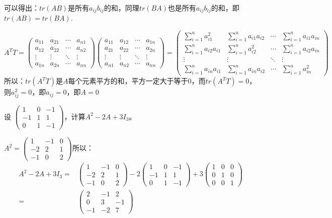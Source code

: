 \documentclass[a4paper]{report}
\begin{document}
\begin{zhengming}
可以得出：$tr(AB)$是所有$a_{ij}b_{ij}$的和，同理$tr(BA)$也是所有$a_{ij}b_{ij}$的和，即$tr(AB)=tr(BA)$.

\begin{equation*}
A^{T}T=\begin{pmatrix}
a_{11}&a_{21}&\cdots&a_{n1}\\
a_{12}&a_{22}&\cdots&a_{n2}\\
\vdots&\vdots&\ddots&\vdots\\
a_{1n}&a_{2n}&\cdots&a_{nn}
\end{pmatrix}\begin{pmatrix}
a_{11}&a_{12}&\cdots&a_{1n}\\
a_{21}&a_{22}&\cdots&a_{2n}\\
\vdots&\vdots&\ddots&\vdots\\
a_{n1}&a_{n2}&\cdots&a_{nn}
\end{pmatrix}=\begin{pmatrix}
\sum_{i=1}^{n}a_{i1}^2&\sum_{i=1}^{n}a_{i1}a_{i2}&\cdots&\sum_{i=1}^{n}a_{i1}a_{in}\\
\sum_{i=1}^{n}a_{i2}a_{i1}&\sum_{i=1}^{n}a_{i2}^2&\cdots&\sum_{i=1}^{n}a_{i2}a_{in}\\
\vdots&\vdots&\ddots&\vdots\\
\sum_{i=1}^{n}a_{in}a_{i1}&\sum_{i=1}^{n}a_{in}a_{i2}&\cdots&\sum_{i=1}^{n}a_{in}^2
\end{pmatrix}
\end{equation*}
所以：$tr(A^{T}T)$是$A$每个元素平方的和，平方一定大于等于0，而$tr(A^{T}T)=0$，则$a_{ij}^2=0$，即$a_{ij}=0$，即$A=0$
\end{zhengming}

\EX 设
$
\begin{pmatrix}
1&0&-1\\ -1&1&1\\ 0&1&-1
\end{pmatrix}
$，计算$A^2-2A+3I_{3}$。

\begin{jie}
$A^2=\begin{pmatrix}
1&-1&0\\ -2&2&1\\ -1&0&2
\end{pmatrix}$所以：
\begin{align*}
A^2-2A+3I_{3}=&\begin{pmatrix}
1&-1&0\\ -2&2&1\\ -1&0&2
\end{pmatrix}-2\begin{pmatrix}
1&0&-1\\ -1&1&1\\ 0&1&-1
\end{pmatrix}+3\begin{pmatrix}
1&0&0\\ 0&1&0\\ 0&0&1
\end{pmatrix}\\
=&\begin{pmatrix}
2&-1&2\\ 0&3&-1\\ -1&-2&7
\end{pmatrix}
\end{align*}
\end{jie}
\end{document}

